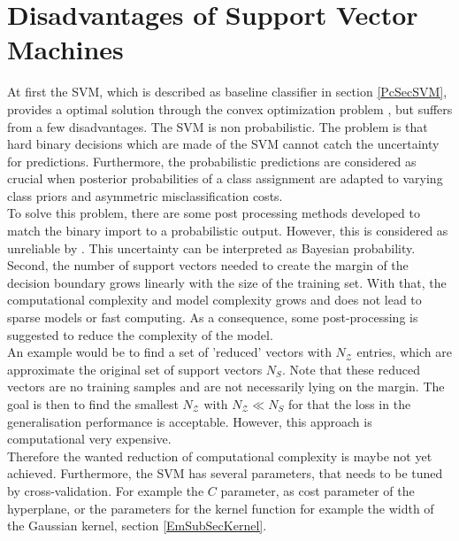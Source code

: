 \section{Disadvantages of Support Vector Machines}\label{PcSecIdea}
At first the \acs{SVM}, which is described as baseline classifier in section \ref{PcSecSVM}, provides a optimal solution through the convex optimization problem \cite[p. 325]{Bishop.2009}, but suffers from a few disadvantages.\newline
The \acs{SVM} is non probabilistic.
The problem is that hard binary decisions which are made of the \acs{SVM} cannot catch the uncertainty for predictions.
Furthermore, the probabilistic predictions are considered as crucial when posterior probabilities of a class assignment are adapted to varying class priors and asymmetric misclassification costs.\cite[p. 239-240]{Tipping.2001}\\
To solve this problem, there are some post processing methods developed to match the binary import to a probabilistic output.
However, this is considered as unreliable by \cite[p. 239-240]{Tipping.2001}. 
This uncertainty can be interpreted as Bayesian probability.\cite[p. 21]{Bishop.2009}\newline 
Second, the number of support vectors needed to create the margin of the decision boundary grows linearly with the size of the training set.
With that, the computational complexity and model complexity grows and does not lead to sparse models or fast computing.
As a consequence, some post-processing is suggested to reduce the complexity of the model.\cite{Chen.2009}\\
An example would be to find a set of 'reduced' vectors with $N_\mathcal{Z}$ entries, which are approximate the original set of support vectors $N_S$.
Note that these reduced vectors are no training samples and are not necessarily lying on the margin.
The goal is then to find the smallest $N_\mathcal{Z}$ with $N_\mathcal{Z} \ll N_S$ for that the loss in the generalisation performance is acceptable.
However, this approach is computational very expensive.\cite{Burges.1997}\\
Therefore the wanted reduction of computational complexity is maybe not yet achieved.\newline
Furthermore, the \ac{SVM} has several parameters, that needs to be tuned by cross-validation.
For example the $C$ parameter, as cost parameter of the hyperplane\cite[p. 420]{TrevorHastie.2009}, or the parameters for the kernel function for example the width of the Gaussian kernel, section \ref{EmSubSecKernel}.
